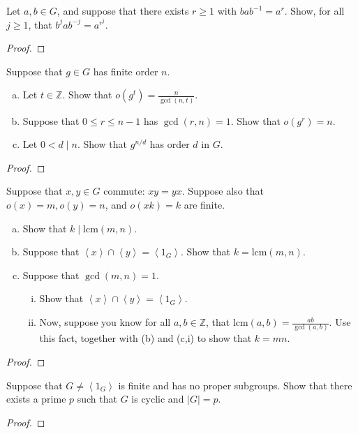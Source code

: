 \documentclass[10pt]{amsart}
\begin{document}
\begin{thm}
	Let $a,b \in G$, and suppose that there exists $r \geq 1$ with $bab^{-1} = a^r.$
	Show, for all $j \geq 1$, that $b^jab^{-j} = a^{r^j}$.
	\begin{proof}
	\end{proof}
\end{thm}

\begin{thm}
	Suppose that $g \in G$ has finite order $n$.
	\begin{enumerate}[(a)]
			\item Let $t \in \mathbb{Z}$.  Show that $o(g^t) = \displaystyle{\frac{n}{\gcd(n,t)}}.$
			\item Suppose that $0 \leq r \leq n-1$ has $\gcd(r,n) = 1$.  Show that $o(g^r) = n$.
			\item Let $0 < d \mid n$.  Show that $g^{n/d}$ has order $d$ in $G$.
	\end{enumerate}
	\begin{proof}
	\end{proof}
\end{thm}

\begin{thm}
	Suppose that $x,y \in G$ commute: $xy = yx$.  Suppose also that $o(x) = m, o(y) = n$, and $o(xk) = k$ are finite.
	\begin{enumerate}[(a)]
		\item Show that $k \mid \text{lcm}(m,n).$
		\item Suppose that $\left< x \right> \cap \left< y \right> = \left< 1_G \right>.$  Show that $k = \text{lcm}(m,n).$
		\item Suppose that $\gcd(m,n) = 1.$
		\begin{enumerate}[i.]
			\item Show that $\left< x \right> \cap \left< y \right> = \left< 1_G \right>.$
			\item Now, suppose you know for all $a,b \in \mathbb{Z}$, that $\text{lcm}(a,b) = \displaystyle{\frac{ab}{\gcd(a,b)}.}$  Use this fact, together with (b) and (c,i) to show that $k = mn.$
		\end{enumerate}
	\end{enumerate}
	\begin{proof}
	\end{proof}
\end{thm}

\begin{thm}
	Suppose that $G \not = \left< 1_G \right>$ is finite and has no proper subgroups.  Show that there exists a prime $p$ such that $G$ is cyclic and $|G| = p$.
	\begin{proof}
	\end{proof}
\end{thm}
\end{document}
